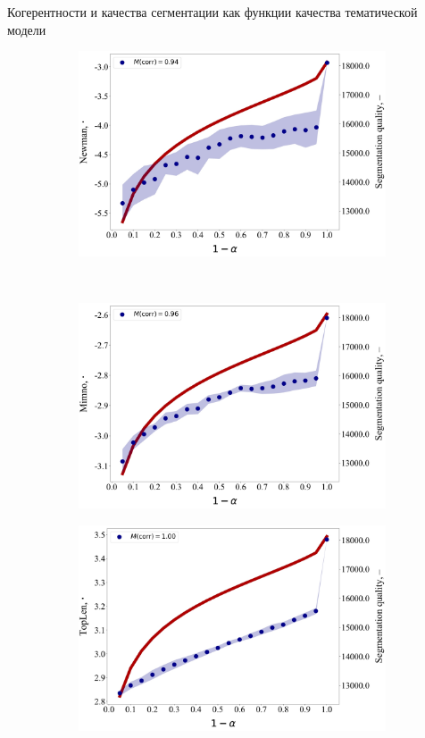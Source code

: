 \documentclass[sans, mathsans, russian]{beamer}
\begin{document}
\begin{frame}{Когерентности и качества сегментации как функции качества тематической модели}
  
  \begin{figure}[h]
    \begin{subfigure}[t]{0.48\textwidth}
      \includegraphics[width=\linewidth]{newman-iteration.jpg}
    \end{subfigure}
    ~
    \begin{subfigure}[t]{0.48\textwidth}
      \includegraphics[width=\linewidth]{mimno-iteration.jpg}
    \end{subfigure}
    \begin{subfigure}[t]{0.48\textwidth}
      \includegraphics[width=\linewidth]{toplen-iteration.jpg}

\end{subfigure}
\end{figure}
\end{frame}
\end{document}
